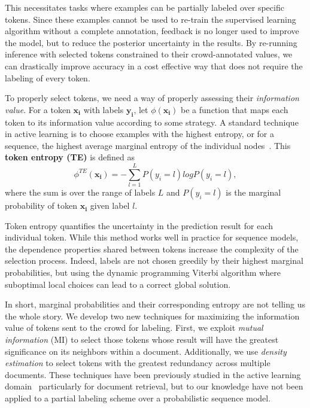 This necessitates tasks where examples can be partially labeled over specific tokens.  Since these examples cannot be used to re-train the supervised learning algorithm without a complete annotation, feedback is no longer used to improve the model, but to reduce the posterior uncertainty in the results.  By re-running inference with selected tokens constrained to their crowd-annotated values, we can drastically improve accuracy in a cost effective way that does not require the labeling of every token.

To properly select tokens, we need a way of properly assessing their \textit{information value}.  For a token $\mathbf{x_{i}}$ with labels $\mathbf{y_{i}}$, let $\phi(\mathbf{x_{i}})$ be a function that maps each token to its information value according to some strategy. A standard technique in active learning is to choose examples with the highest entropy, or for a sequence, the highest average marginal entropy of the individual nodes~\cite{Settles:2008:AAL:1613715.1613855}.  This \textbf{token entropy (TE)} is defined as
\begin{equation}
\phi^{TE}(\mathbf{x_{i}}) = -\sum_{l=1}^{L}P(y_{i}=l)logP(y_{i}=l),
\end{equation}
where the sum is over the range of labels $L$ and $P(y_{i}=l)$ is the marginal probability of token $\mathbf{x_{i}}$ given label $l$.

Token entropy quantifies the uncertainty in the prediction result for each individual token. While this method works well in practice for sequence models, the dependence properties shared between tokens increase the complexity of the selection process. Indeed, labels are not chosen greedily by their highest marginal probabilities, but using the dynamic programming Viterbi algorithm where suboptimal local choices can lead to a correct global solution.

In short, marginal probabilities and their corresponding entropy are not telling us the whole story. We develop two new techniques for maximizing the information value of tokens sent to the crowd for labeling. First, we exploit \textit{mutual information} (MI) to select those tokens whose result will have the greatest significance on its neighbors within a document.  Additionally, we use \textit{density estimation} to select tokens with the greatest redundancy across multiple documents.  These techniques have been previously studied in the active learning domain~\cite{Xu:2007:IDD:1763653.1763684,ZhaoJi} particularly for document retrieval, but to our knowledge have not been applied to a partial labeling scheme over a probabilistic sequence model.

